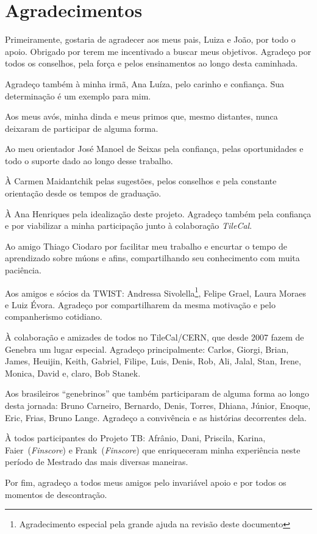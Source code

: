 \chapter*{Agradecimentos}


Primeiramente, gostaria de agradecer aos meus pais, Luiza e João, por todo o
apoio. Obrigado por terem me incentivado a buscar meus objetivos.  Agradeço por
todos os conselhos, pela força  e pelos ensinamentos ao longo desta caminhada.

Agradeço também à minha irmã, Ana Luíza, pelo carinho e confiança. Sua
determinação é um exemplo para mim.

Aos meus avós, minha dinda e meus primos que, mesmo distantes, nunca deixaram de
participar de alguma forma.

Ao meu orientador José Manoel de Seixas pela confiança, pelas oportunidades e
todo o suporte dado ao longo desse trabalho.

À Carmen Maidantchik pelas sugestões, pelos conselhos e pela constante
orientação desde os tempos de graduação.

À Ana Henriques pela idealização deste projeto. Agradeço também pela confiança
e por viabilizar a minha participação junto à colaboração \emph{TileCal}.

Ao amigo Thiago Ciodaro por facilitar meu trabalho e encurtar o tempo de
aprendizado sobre múons e afins, compartilhando seu conhecimento com muita
paciência.

Aos amigos e sócios da TWIST: Andressa Sivolella\footnote{Agradecimento
especial pela grande ajuda na revisão deste documento}, Felipe Grael, Laura
Moraes e Luiz Évora. Agradeço por compartilharem da mesma motivação e pelo
companherismo cotidiano.

À colaboração e amizades de todos no TileCal/CERN, que desde 2007 fazem de
Genebra um lugar especial. Agradeço principalmente: Carlos,
Giorgi, Brian, James, Heuijin, Keith, Gabriel, Filipe, Luis, Denis, Rob, Ali,
Jalal, Stan, Irene, Monica,  David e, claro, Bob Stanek.

Aos brasileiros ``genebrinos'' que também participaram de alguma forma ao longo
desta jornada: Bruno Carneiro, Bernardo, Denis, Torres, Dhiana, Júnior, Enoque,
Eric, Frias, Bruno Lange. Agradeço a convivência e as histórias decorrentes
dela.

À todos participantes do Projeto TB: Afrânio, Dani, Priscila, Karina,
Faier~(\emph{Finscore}) e Frank~(\emph{Finscore}) que enriqueceram minha
experiência neste período de Mestrado das mais diversas maneiras.

Por fim, agradeço a todos meus amigos pelo invariável apoio e por todos os
momentos de descontração.



